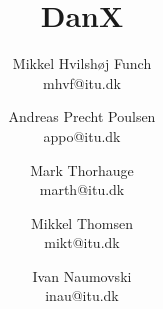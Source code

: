 \documentclass[pdftext, 12pt, a4paper]{report}
\begin{document}
\title{DanX}
\date{}
\author{		Mikkel Hvilshøj Funch \\ mhvf@itu.dk
		\and 	Andreas Precht Poulsen \\ appo@itu.dk
		\and 	Mark Thorhauge \\ marth@itu.dk
		\and 	Mikkel Thomsen \\ mikt@itu.dk
		\and 	Ivan Naumovski \\ inau@itu.dk		
		}
\maketitle
\tableofcontents


\end{document}
